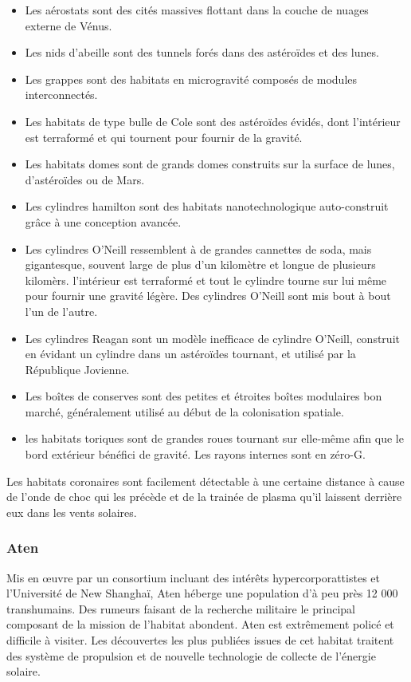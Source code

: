 \begin{itemize} \item Les aérostats sont des cités massives flottant dans la couche de nuages externe de Vénus. \item Les nids d'abeille sont des tunnels forés dans des astéroïdes et des lunes. \item Les grappes sont des habitats en microgravité composés de modules interconnectés. \item Les habitats de type bulle de Cole sont des astéroïdes évidés, dont l'intérieur est terraformé et qui tournent pour fournir de la gravité. \item Les habitats domes sont de grands domes construits sur la surface de lunes, d'astéroïdes ou de Mars. \item Les cylindres hamilton sont des habitats nanotechnologique auto-construit grâce à une conception avancée. \item Les cylindres O'Neill ressemblent à de grandes cannettes de soda, mais gigantesque, souvent large de plus d'un kilomètre et longue de plusieurs kilomèrs. l'intérieur est terraformé et tout le cylindre tourne sur lui même pour fournir une gravité légère. Des cylindres O'Neill sont mis bout à bout l'un de l'autre. \item Les cylindres Reagan sont un modèle inefficace de cylindre O'Neill, construit en évidant un cylindre dans un astéroïdes tournant, et utilisé par la République Jovienne. \item Les boîtes de conserves sont des petites et étroites boîtes modulaires bon marché, généralement utilisé au début de la colonisation spatiale. \item les habitats toriques sont de grandes roues tournant sur elle-même afin que le bord extérieur bénéfici de gravité. Les rayons internes sont en zéro-G. \end{itemize} 

Les habitats coronaires sont facilement détectable à une certaine distance à cause de l'onde de choc qui les précède et de la trainée de plasma qu'il laissent derrière eux dans les vents solaires. 

\subsubsection{Aten} \label{sec:aten} 

Mis en œuvre par un consortium incluant des intérêts hypercorporattistes et l'Université de New Shanghaï, Aten héberge une population d'à peu près 12 000 transhumains. Des rumeurs faisant de la recherche militaire le principal composant de la mission de l'habitat abondent. Aten est extrêmement policé et difficile à visiter. Les découvertes les plus publiées issues de cet habitat traitent des système de propulsion et de nouvelle technologie de collecte de l'énergie solaire. 

